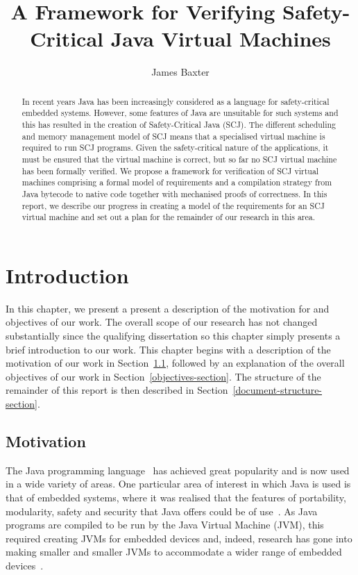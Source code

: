 \documentclass[a4paper,10pt]{report}
\title{A Framework for Verifying Safety-Critical Java Virtual Machines}
\author{James Baxter}
\date{}
\begin{document}
\maketitle

\begin{abstract}
  In recent years Java has been increasingly considered as a language
  for safety-critical embedded systems.
  However, some features of Java are unsuitable for such systems and
  this has resulted in the creation of Safety-Critical Java (SCJ).
  The different scheduling and memory management model of SCJ means
  that a specialised virtual machine is required to run SCJ programs.
  Given the safety-critical nature of the applications, it must be
  ensured that the virtual machine is correct, but so far no SCJ
  virtual machine has been formally verified.
  We propose a framework for verification of SCJ virtual machines
  comprising a formal model of requirements and a compilation strategy
  from Java bytecode to native code together with mechanised proofs of
  correctness.
  In this report, we describe our progress in creating a model of the
  requirements for an SCJ virtual machine and set out a plan for the
  remainder of our research in this area.
\end{abstract}

\tableofcontents

\chapter{Introduction}

In this chapter, we present a present a description of the motivation
for and objectives of our work.
The overall scope of our research has not changed substantially since
the qualifying dissertation so this chapter simply presents a brief
introduction to our work.
This chapter begins with a description of the motivation of our work
in Section~\ref{motivation-section}, followed by an explanation of the
overall objectives of our work in Section~\ref{objectives-section}.
The structure of the remainder of this report is then described in
Section~\ref{document-structure-section}.


\section{Motivation}
\label{motivation-section}

The Java programming language~\cite{gosling2013} has achieved great
popularity and is now used in a wide variety of areas.
One particular area of interest in which Java is used is that of
embedded systems, where it was realised that the features of
portability, modularity, safety and security that Java offers could be
of use~\cite{mulchandani1998}.
As Java programs are compiled to be run by the Java Virtual Machine
(JVM), this required creating JVMs for embedded devices and, indeed,
research has gone into making smaller and smaller JVMs to accommodate
a wider range of embedded devices~\cite{caska2011,thomm2010}.
\end{document}
